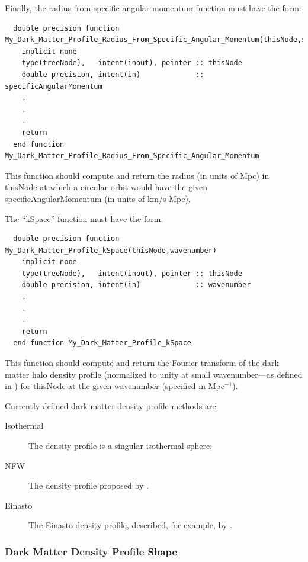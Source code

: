 Finally, the radius from specific angular momentum function must have the form:
\begin{verbatim}
  double precision function My_Dark_Matter_Profile_Radius_From_Specific_Angular_Momentum(thisNode,specificAngularMomentum)
    implicit none
    type(treeNode),   intent(inout), pointer :: thisNode
    double precision, intent(in)             :: specificAngularMomentum
    .
    .
    .
    return
  end function My_Dark_Matter_Profile_Radius_From_Specific_Angular_Momentum
\end{verbatim}
This function should compute and return the radius (in units of Mpc) in {\normalfont \ttfamily thisNode} at which a circular orbit would have the given {\normalfont \ttfamily specificAngularMomentum} (in units of km/s Mpc).

The ``kSpace'' function must have the form:
\begin{verbatim}
  double precision function My_Dark_Matter_Profile_kSpace(thisNode,wavenumber)
    implicit none
    type(treeNode),   intent(inout), pointer :: thisNode
    double precision, intent(in)             :: wavenumber
    .
    .
    .
    return
  end function My_Dark_Matter_Profile_kSpace
\end{verbatim}
This function should compute and return the Fourier transform of the dark matter halo density profile (normalized to unity at small wavenumber---as defined in \citealt{cooray_halo_2002}) for {\normalfont \ttfamily thisNode} at the given {\normalfont \ttfamily wavenumber} (specified in Mpc$^{-1}$).

Currently defined dark matter density profile methods are:
\begin{description}
 \item [{\normalfont \ttfamily Isothermal}] The density profile is a singular isothermal sphere;
 \item [{\normalfont \ttfamily NFW}] The density profile proposed by \cite{navarro_universal_1997}.
 \item [{\normalfont \ttfamily Einasto}] The Einasto density profile, described, for example, by \cite{cardone_spherical_2005}.
\end{description}

\subsubsection{Dark Matter Density Profile Shape}\label{sec:darkMatterProfileShape}

